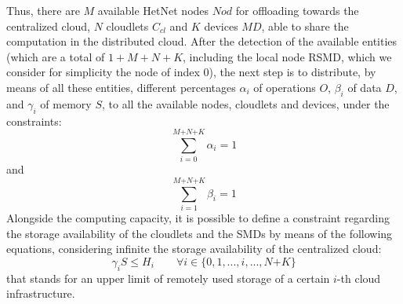 \documentclass[twoside,openright]{report}
\begin{document}
Thus, there are $M$ available \gls{HetNet} nodes $\textit{Nod}$ for offloading towards the centralized cloud,  $N$ cloudlets $C_{\textit{cl}}$ and $K$ devices $\textit{MD}$, able to share the computation in the distributed cloud.
After the detection of the available entities (which are a total of $1+M+N+K$, including the local node \gls{RSMD}, which we consider for simplicity the node of index 0), the next step is to distribute, by means of all these entities, different percentages $\alpha_i$  of operations $O$, $\beta_i$ of data $D$, and $\gamma_i$ of memory $S$, to all the available nodes, cloudlets and devices, under the constraints:
\begin{equation}
\label{eq:alpha}
\sum_{i=0}^\textit{M+N+K} \alpha_i = 1
\end{equation}
and
\begin{equation}
\label{eq:beta}
\sum_{i=1}^\textit{M+N+K} \beta_i = 1
\end{equation}
Alongside the computing capacity, it is possible to define a constraint regarding the storage availability of the cloudlets and the \glspl{SMD} by means of the following equations, considering infinite the storage availability of the centralized cloud:
\begin{equation}
\label{eq:storage}
\gamma_i S \le H_i \quad \quad \forall i \in \{0,1,...,i,..., \textit{N+K}\}
\end{equation}
that stands for an upper limit of remotely used storage of a certain $i$-th cloud infrastructure.
\end{document}
